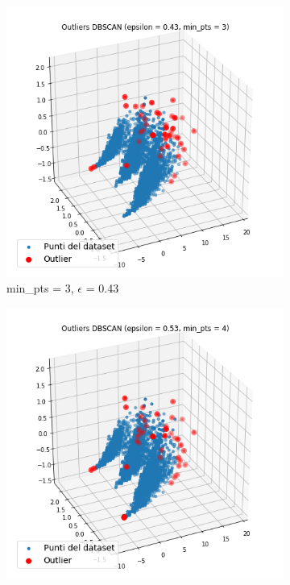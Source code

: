 \documentclass[a4paper]{article}
\begin{document}
\begin{figure}[h]
\centering
\begin{subfigure}[b]{.32\linewidth}
\includegraphics[width=\linewidth]{images/dbscan_min_pts_3.png}
\caption{min\_pts = 3, $\epsilon$ = 0.43}
\label{subfig:dbscan1}
\end{subfigure}
\begin{subfigure}[b]{.32\linewidth}
\includegraphics[width=\linewidth]{images/dbscan_min_pts_4.png}

\end{subfigure}
\end{figure}
\end{document}
